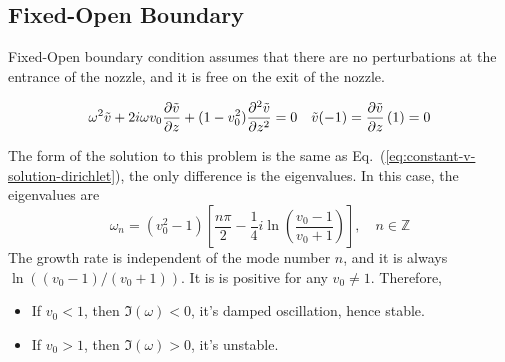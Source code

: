 \subsection{Fixed-Open Boundary}
Fixed-Open boundary condition assumes that there are no perturbations at the entrance of the nozzle, and it is free on the exit of the nozzle.

\begin{equation} \label{eq:constant-v-problem-fixed-open}
	\omega^2\tilde{v} + 2i\omega v_0\pdv{\tilde{v}}{z} + (1-v_0^2)\pdv[2]{\tilde{v}}{z} = 0
	\quad
	\tilde{v}(-1) = \pdv{\tilde{v}}{z}\,(1) = 0
\end{equation}

The form of the solution to this problem is the same as Eq.~(\ref{eq:constant-v-solution-dirichlet}), the only difference is the eigenvalues. In this case, the eigenvalues are
\begin{equation}
	\omega_n = (v_0^2 - 1) \left[\frac{n\pi}{2} - \frac{1}{4}i\ln(\frac{v_0-1}{v_0+1})\right], \quad n\in\mathbb{Z}
	\label{eq:eigvals-constant-v-fixed-open}
\end{equation}
The growth rate is independent of the mode number $n$, and it is always $\ln((v_0-1)/(v_0+1))$. It is is positive for any $v_0\neq 1$. Therefore,
\begin{itemize}
	\item If $v_0<1$, then $\Im(\omega)<0$, it's damped oscillation, hence stable.
	\item If $v_0>1$, then $\Im(\omega)>0$, it's unstable.
\end{itemize}

